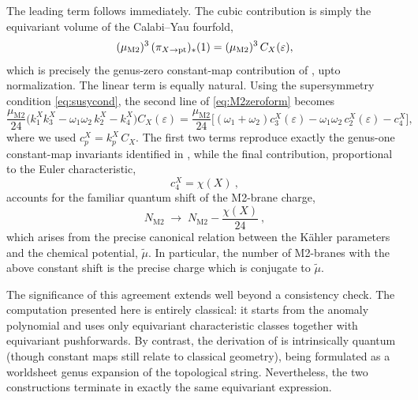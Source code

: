 \documentclass[11pt,a4paper]{article}
\theoremstyle{definition}
\theoremstyle{identity}
\theoremstyle{remark}
\newcommand{\be}{\begin{equation}}
\newcommand{\ee}{\end{equation}}
\begin{document}
The leading term follows immediately. The cubic contribution is simply the equivariant volume of
the Calabi--Yau fourfold,
\be
(\mu_\text{M2})^3\,(\pi_{X\rightarrow{\rm pt}})_*(1)
=
(\mu_\text{M2})^3\,C_X(\varepsilon),
\ee
which is precisely the genus-zero constant-map contribution of
\cite[Eq.~(2.18)]{Cassia:2025jkr}, upto normalization.
The linear term is equally natural. Using the supersymmetry
condition \eqref{eq:susycond}, the second line of \eqref{eq:M2zeroform} becomes
\be
\frac{\mu_\text{M2}}{24}
\Big(
k_1^Xk_3^X
-\omega_1\omega_2\,k_2^X
-k_4^X
\Big)
C_X(\varepsilon)
=
\frac{\mu_\text{M2}}{24}
\Big[
(\omega_1+\omega_2)c_3^X(\varepsilon)
-\omega_1\omega_2\,c_2^X(\varepsilon)
-c_4^X
\Big],
\ee
where we used $c_p^X=k_p^X\,C_X$. The first two terms reproduce exactly the genus-one
constant-map invariants identified in \cite{Cassia:2025jkr}, while the final contribution,
proportional to the Euler characteristic,
\be
c_4^X=\chi(X)\ ,
\ee
accounts for the familiar quantum shift of the M2-brane charge, \cite{Bergman:2009zh,Cassia:2025aus}
\be
N_\text{M2}\;\rightarrow\;
N_\text{M2}-\frac{\chi(X)}{24}\ ,
\ee
which arises from the precise canonical relation between the K\"ahler parameters and the
chemical potential, $\tilde \mu$. In particular, the number of M2-branes with the above constant shift is the precise charge which is conjugate to $\tilde{\mu}$.%

The significance of this agreement extends well beyond a consistency check. The computation
presented here is entirely classical: it starts from the 
anomaly polynomial and uses only equivariant characteristic classes together with equivariant
pushforwards. By contrast, the derivation of \cite{Cassia:2025aus,Cassia:2025jkr} is intrinsically quantum (though constant maps still relate to classical geometry),
being formulated as a worldsheet genus expansion of the topological string. Nevertheless, the
two constructions terminate in exactly the same equivariant expression. 
\end{document}
